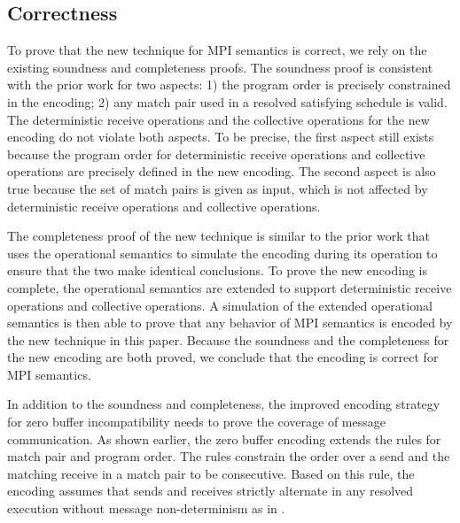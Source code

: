 \subsection{Correctness}

To prove that the new technique for MPI semantics is correct, we rely on the existing soundness and completeness proofs. The soundness proof is consistent with the prior work for two aspects: 1) the program order is precisely constrained in the encoding; 2) any match pair used in a resolved satisfying schedule is valid. The deterministic receive operations and the collective operations for the new encoding do not violate both aspects. To be precise, the first aspect still exists because the program order for deterministic receive operations and collective operations are precisely defined in the new encoding. The second aspect is also true because the set of match pairs is given as input, which is not affected by deterministic receive operations and collective operations.

The completeness proof of the new technique is similar to the prior work that uses the operational semantics to simulate the encoding during its operation to ensure that the two make identical conclusions. To prove the new encoding is complete, the operational semantics are extended to support deterministic receive operations and collective operations. A simulation of the extended operational semantics is then able to prove that any behavior of MPI semantics is encoded by the new technique in this paper. Because the soundness and the completeness for the new encoding are both proved, we conclude that the encoding is correct for MPI semantics.

In addition to the soundness and completeness, the improved encoding strategy for zero buffer incompatibility needs to prove the coverage of message communication. As shown earlier, the zero buffer encoding extends the rules for match pair and program order. The rules constrain the order over a send and the matching receive in a match pair to be consecutive. Based on this rule, the encoding assumes that sends and receives strictly alternate in any resolved execution without message non-determinism as in . 

